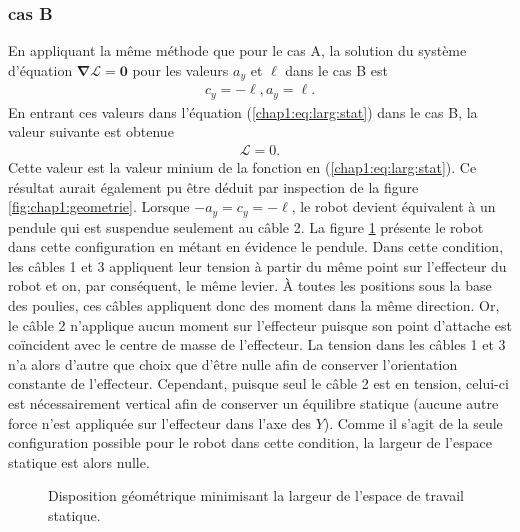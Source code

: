 \subsubsection{cas B}
En appliquant la même méthode que pour le cas A, la solution du système d'équation $\bm{\nabla} \mathcal{L} = \mathbf{0}$ pour les valeurs $a_y$ et $\ell$ dans le cas B est 
\begin{align}
c_y = -\ell, a_y =\ell.
\end{align}
En entrant ces valeurs dans l'équation (\ref{chap1:eq:larg:stat}) dans le cas B, la valeur suivante est obtenue
\begin{align}
\mathcal{L} = 0. 
\end{align}
Cette valeur est la valeur minium de la fonction en (\ref{chap1:eq:larg:stat}). Ce résultat aurait également pu être déduit par inspection de la figure \ref{fig:chap1:geometrie}. Lorsque $-a_y=c_y=-\ell$, le robot devient équivalent à un pendule qui est suspendue seulement au câble 2. La figure \ref{chap1:fig:compare_pm_min} présente le robot dans cette configuration en métant en évidence le pendule. Dans cette condition, les câbles 1 et 3 appliquent leur tension à partir du même point sur l'effecteur du robot et on, par conséquent, le même levier. À toutes les positions sous la base des poulies, ces câbles appliquent donc des moment dans la même direction. Or, le câble 2 n'applique aucun moment sur l'effecteur puisque son point d'attache est coïncident avec le centre de masse de l'effecteur. La tension dans les câbles 1 et 3 n'a alors d'autre que choix que d'être nulle afin de conserver l'orientation constante de l'effecteur. Cependant, puisque seul le câble 2 est en tension, celui-ci est nécessairement vertical afin de conserver un équilibre statique (aucune autre force n'est appliquée sur l'effecteur dans l'axe des $Y$). Comme il s'agit de la seule configuration possible pour le robot dans cette condition, la largeur de l'espace statique est alors nulle.\par
\begin{figure}[h] 
\centering
{}
\caption{\label{chap1:fig:compare_pm_min} Disposition géométrique minimisant la largeur de l'espace de travail statique.}
\end{figure}
